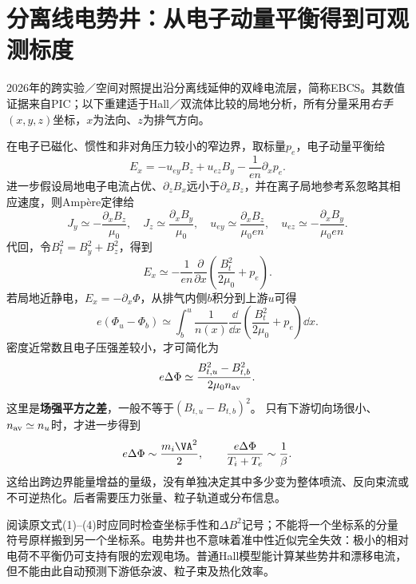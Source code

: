 \section{分离线电势井：从电子动量平衡得到可观测标度}
2026年的跨实验／空间对照提出沿分离线延伸的双峰电流层，简称EBCS。其数值证据来自PIC；以下重建适于Hall／双流体比较的局地分析，所有分量采用\emph{右手}$(x,y,z)$坐标，$x$为法向、$z$为排气方向。\citep{L312}

在电子已磁化、惯性和非对角压力较小的窄边界，取标量$p_e$，电子动量平衡给
\begin{equation}
 E_x=-u_{ey}B_z+u_{ez}B_y-\frac{1}{en}\partial_xp_e.
\end{equation}
进一步假设局地电子电流占优、$\partial_zB_x$远小于$\partial_xB_z$，并在离子局地参考系忽略其相应速度，则Ampère定律给
\begin{equation}
 J_y\simeq-\frac{\partial_xB_z}{\mu_0},\quad
 J_z\simeq\frac{\partial_xB_y}{\mu_0},\quad
 u_{ey}\simeq\frac{\partial_xB_z}{\mu_0en},\quad
 u_{ez}\simeq-\frac{\partial_xB_y}{\mu_0en}.
\end{equation}
代回，令$B_t^2=B_y^2+B_z^2$，得到
\begin{equation}
 E_x\simeq-\frac{1}{en}\frac{\partial}{\partial x}
 \left(\frac{B_t^2}{2\mu_0}+p_e\right).
\end{equation}
若局地近静电，$E_x=-\partial_x\Phi$，从排气内侧$b$积分到上游$u$可得
\begin{equation}
 e(\Phi_u-\Phi_b)
 \simeq\int_b^u\frac{1}{n(x)}\frac{\dd}{\dd x}
 \left(\frac{B_t^2}{2\mu_0}+p_e\right)\dd x.
\end{equation}
密度近常数且电子压强差较小，才可简化为
\begin{equation}
 e\Delta\Phi\simeq\frac{B_{t,u}^2-B_{t,b}^2}{2\mu_0n_{\rm av}}.
 \label{eq:separatrix_potential}
\end{equation}
这里是\textbf{场强平方之差}，一般不等于$(B_{t,u}-B_{t,b})^2$。
只有下游切向场很小、$n_{\rm av}\simeq n_u$时，才进一步得到
\begin{equation}
 e\Delta\Phi\sim\frac{m_i\VA^2}{2},\qquad
 \frac{e\Delta\Phi}{T_i+T_e}\sim\frac1\beta.
\end{equation}
这给出跨边界能量增益的量级，没有单独决定其中多少变为整体喷流、反向束流或不可逆热化。后者需要压力张量、粒子轨道或分布信息。

阅读原文式(1)--(4)时应同时检查坐标手性和$\Delta B^2$记号；不能将一个坐标系的分量符号原样搬到另一个坐标系。电势井也不意味着准中性近似完全失效：极小的相对电荷不平衡仍可支持有限的宏观电场。普通Hall模型能计算某些势井和漂移电流，但不能由此自动预测下游低杂波、粒子束及热化效率。

